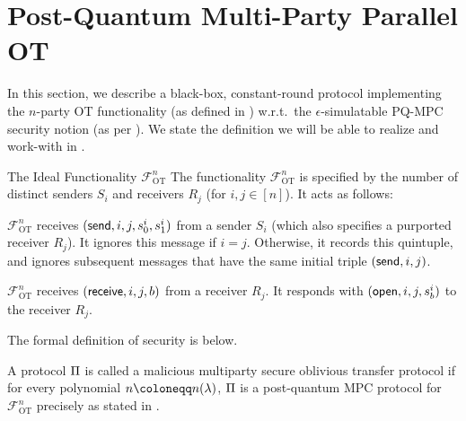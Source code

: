 \section{Post-Quantum Multi-Party Parallel OT}
\label{sec:parallel-OT}


In this section, we describe a black-box, constant-round protocol implementing the $n$-party %
OT functionality (as defined in ) w.r.t.\ the $\epsilon$-simulatable PQ-MPC security notion (as per ).  We state the definition we will be able to realize and work-with in .


\begin{FigureBox}[label={fig:F-OT}]{The Ideal Functionality $\mathcal{F}^n_{\text{OT}}$}
The functionality $\mathcal{F}^n_{\text{OT}}$ is specified by the number of distinct senders $S_i$ and receivers $R_j$ (for $i,j \in [n]$). It acts as follows: 

 $\mathcal{F}^n_{\text{OT}}$ receives $(\mathsf{send},i,j,s_0^i,s_1^i)$ from a sender $S_i$ (which also specifies a purported receiver $R_j$). It ignores this message if $i=j$. Otherwise, it records this quintuple, and ignores subsequent messages that have the same initial triple $(\mathsf{send},i,j)$. 

 $\mathcal{F}^n_{\text{OT}}$ receives $(\mathsf{receive},i,j,b)$ from a receiver $R_j$. %
It responds with $(\mathsf{open},i,j,s_b^i)$ to the receiver $R_j$.  
    
\end{FigureBox}

\iffalse
The formal definition of security is below. 

\begin{definition}\label{def:mal-par-OT}
A protocol $\mathrm{\Pi}$ is called a malicious  multiparty secure oblivious transfer protocol if for every polynomial $n \coloneqq n(\secpar)$, %
$\mathrm{\Pi}$ %
is a post-quantum MPC protocol for $\mathcal{F}^n_{\text{OT}}$ precisely as stated in . 

\end{definition}

